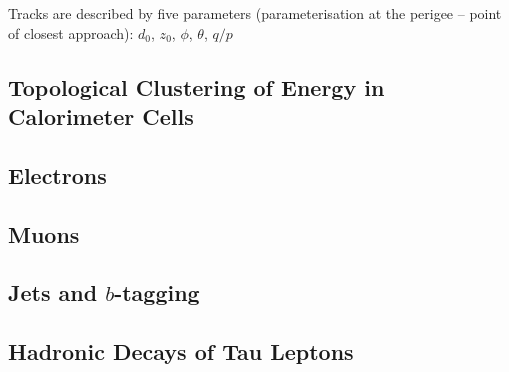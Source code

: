 
\cite{PERF-2015-08}

\cite{Salzburger:2015sgq}






Tracks are described by five parameters (parameterisation at the perigee --
point of closest approach): $d_0$, $z_0$, $\phi$, $\theta$, $q / p$



\subsection{Topological Clustering of Energy in Calorimeter Cells}

\subsection{Electrons}

\subsection{Muons}

\subsection{Jets and $b$-tagging}

\subsection{Hadronic Decays of Tau Leptons}

